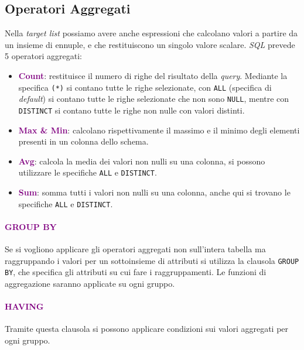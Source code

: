 \subsection{Operatori Aggregati}

Nella \emph{target list} possiamo avere anche espressioni che calcolano
valori a partire da un insieme di ennuple, e che restituiscono un singolo valore
scalare. \emph{SQL} prevede 5 operatori aggregati:
\begin{itemize}
    \item \textbf{\textcolor{purple}{Count}}: restituisce il numero di righe del risultato della \emph{query}. Mediante
        la specifica \verb|(*)| si contano tutte le righe selezionate, con \verb|ALL| (specifica di \emph{default}) si contano tutte le righe selezionate che non sono \verb|NULL|,
        mentre con \verb|DISTINCT| si contano tutte le righe non nulle con valori distinti.
    \item \textbf{\textcolor{purple}{Max \& Min}}: calcolano rispettivamente il massimo e il minimo degli elementi presenti
        in un colonna dello schema.
    \item \textbf{\textcolor{purple}{Avg}}: calcola la media dei valori non nulli su una colonna, si possono utilizzare le specifiche \verb|ALL| e \verb|DISTINCT|.
    \item \textbf{\textcolor{purple}{Sum}}: somma tutti i valori non nulli su una colonna, anche qui si trovano le specifiche \verb|ALL| e \verb|DISTINCT|.
\end{itemize}

\paragraph{\textcolor{purple}{GROUP BY}} Se si vogliono applicare gli operatori aggregati non sull'intera
tabella ma raggruppando i valori per un sottoinsieme di attributi si utilizza la clausola \verb|GROUP BY|, che specifica
gli attributi su cui fare i raggruppamenti. Le funzioni di aggregazione saranno applicate su ogni gruppo.

\paragraph{\textcolor{purple}{HAVING}} Tramite questa clausola si possono applicare condizioni sui valori aggregati per ogni gruppo. 